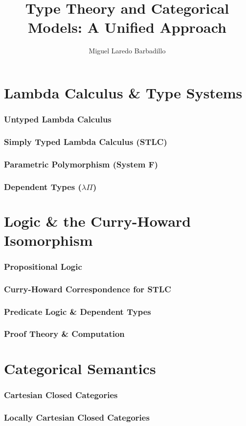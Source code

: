 \documentclass[12pt]{book}
\title{Type Theory and Categorical Models: A Unified Approach}
\author{Miguel Laredo Barbadillo}
\begin{document}
\frontmatter
\maketitle
\tableofcontents

\mainmatter

\part{Lambda Calculus \& Type Systems}

\section{Untyped Lambda Calculus}

\section{Simply Typed Lambda Calculus (STLC)}

\section{Parametric Polymorphism (System F)}

\section{Dependent Types ($\lambda\Pi$)}

\part{Logic \& the Curry-Howard Isomorphism}

\section{Propositional Logic}

\section{Curry-Howard Correspondence for STLC}

\section{Predicate Logic \& Dependent Types}

\section{Proof Theory \& Computation}

\part{Categorical Semantics}

\section{Cartesian Closed Categories}

\section{Locally Cartesian Closed Categories}


\backmatter

\appendix

\printbibliography
\end{document}
